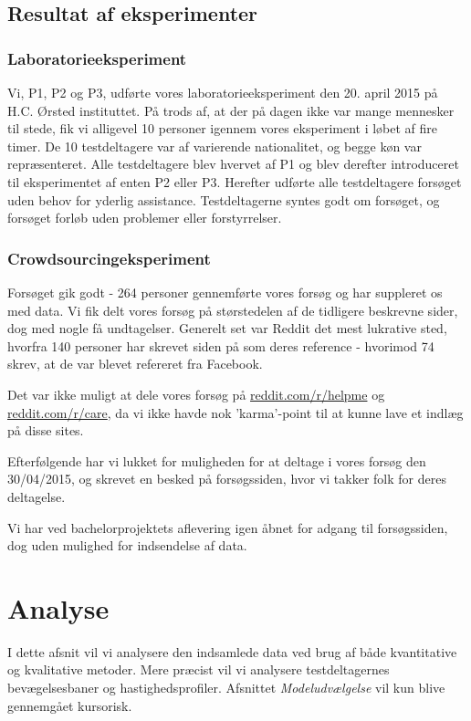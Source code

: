 \section*{Resultat af eksperimenter}

\subsection*{Laboratorieeksperiment}
Vi, P1, P2 og P3, udførte vores laboratorieeksperiment den 20. april 2015 på H.C. Ørsted instituttet. På trods af, at der på dagen ikke var mange mennesker til stede, fik vi alligevel 10 personer igennem vores eksperiment i løbet af fire timer. De 10 testdeltagere var af varierende nationalitet, og begge køn var repræsenteret. Alle testdeltagere blev hvervet af P1 og blev derefter introduceret til eksperimentet af enten P2 eller P3. Herefter udførte alle testdeltagere forsøget uden behov for yderlig assistance. Testdeltagerne syntes godt om forsøget, og forsøget forløb uden problemer eller forstyrrelser.

\subsection*{Crowdsourcingeksperiment}
Forsøget gik godt - 264 personer gennemførte vores forsøg og har suppleret os med data. Vi fik delt vores forsøg på størstedelen af de tidligere beskrevne sider, dog med nogle få undtagelser. Generelt set var Reddit det mest lukrative sted, hvorfra 140 personer har skrevet siden på som deres reference - hvorimod 74 skrev, at de var blevet refereret fra Facebook.

Det var ikke muligt at dele vores forsøg på \url{reddit.com/r/helpme} og \url{reddit.com/r/care}, da vi ikke havde nok 'karma'-point til at kunne lave et indlæg på disse sites.

Efterfølgende har vi lukket for muligheden for at deltage i vores forsøg den 30/04/2015, og skrevet en besked på forsøgssiden, hvor vi takker folk for deres deltagelse.

Vi har ved bachelorprojektets aflevering igen åbnet for adgang til forsøgssiden, dog uden mulighed for indsendelse af data.

\chapter*{Analyse}
I dette afsnit vil vi analysere den indsamlede data ved brug af både kvantitative og kvalitative metoder. Mere præcist vil vi analysere testdeltagernes bevægelsesbaner og hastighedsprofiler. Afsnittet \textit{Modeludvælgelse} vil kun blive gennemgået kursorisk.

